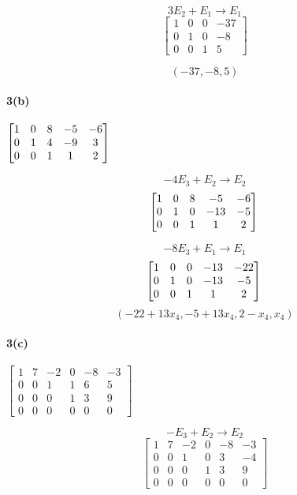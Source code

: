 \documentclass[a4paper,11pt,twoside]{report}
\begin{document}
\[3E_2 + E_1 \to E_1\]
\[ \begin{bmatrix} 1 & 0 & 0 & -37 \\ 0 & 1 & 0 & -8 \\ 0 & 0 & 1 & 5 \end{bmatrix}\]

\[\boxed{(-37,-8,5)}\]

\paragraph{3(b)}
$\begin{bmatrix} 1 & 0 & 8 & -5 & -6 \\ 0 & 1 & 4 & -9 & 3 \\ 0 & 0 & 1 & 1 & 2 \end{bmatrix}  \\$

\[-4E_3+E_2 \to E_2\]
\[\begin{bmatrix} 1 & 0 & 8 & -5 & -6 \\ 0 & 1 & 0 & -13 & -5 \\ 0 & 0 & 1 & 1 & 2 \end{bmatrix}  \\\]

\[-8E_3 + E_1 \to E_1\]
\[\begin{bmatrix} 1 & 0 & 0 & -13 & -22 \\ 0 & 1 & 0 & -13 & -5 \\ 0 & 0 & 1 & 1 & 2 \end{bmatrix}  \\\]
\[\boxed{(-22+13x_4, -5 + 13 x_4, 2 - x_4, x_4)}\]

\paragraph{3(c)}
$\begin{bmatrix} 1 & 7 & -2 & 0 & -8 & -3 \\ 0 & 0 & 1 & 1 & 6 & 5 \\ 0 & 0 & 0 & 1 & 3 & 9 \\ 0 & 0 & 0 & 0 & 0 & 0 \end{bmatrix} $

\[-E_3+ E_2 \to E_2\]
\[\begin{bmatrix} 1 & 7 & -2 & 0 & -8 & -3 \\ 0 & 0 & 1 & 0 & 3 & -4 \\ 0 & 0 & 0 & 1 & 3 & 9 \\ 0 & 0 & 0 & 0 & 0 & 0 \end{bmatrix} \]
\end{document}
